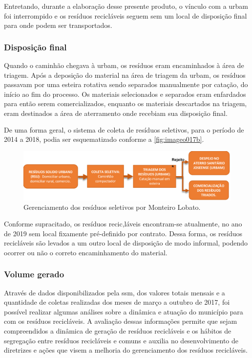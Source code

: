 Entretando,  durante a elaboração desse presente produto, o vínculo com a \gls{urbam} foi interrompido e os resíduos recicláveis seguem sem um local de disposição final para onde podem ser transportados.

\subsubsection{Disposição final}

Quando o caminhão chegava à \gls{urbam}, os resíduos eram encaminhados à área de triagem. Após a deposição do material na área de triagem da \gls{urbam}, os resíduos passavam por uma esteira rotativa sendo separados manualmente por catação, do início ao fim do processo. Os materiais selecionados e separados eram enfardados para então serem comercializados, enquanto os materiais descartados na triagem, eram destinados a área de aterramento onde recebiam sua disposição final. 

De uma forma geral, o sistema de coleta de resíduos seletivos, para o período de 2014 a 2018, podia ser esquematizado conforme a \autoref{fig:imageo017b}.

\begin{figure}
	\centering
	\includegraphics[width=0.75\linewidth]{produtos/prodtres/image017b}
	\caption{Gerenciamento dos resíduos seletivos por Monteiro Lobato.}
	\label{fig:image017b}
\end{figure}

Conforme supracitado, os resíduos recic,láveis encontram-se atualmente, no ano de 2019 sem local fixamente pré-definido por contrato. Dessa forma, os resíduos recicláveis são levados a um outro local de disposição de modo informal, podendo ocorrer ou não o correto encaminhamento do material.

\subsubsection{Volume gerado}

Através de dados disponibilizados pela \gls{ssm}, dos valores totais mensais e a quantidade de coletas realizadas dos meses de março a outubro de 2017, foi possível realizar algumas análises sobre a dinâmica e atuação do município para com os resíduos recicláveis. A avaliação dessas informações permite que sejam compreendidos a dinâmica de geração de resíduos recicláveis e os hábitos de segregação entre resíduos recicláveis e comuns e auxilia no desenvolvimento de diretrizes e ações que visem a melhoria do gerenciamento dos resíduos recicláveis.

